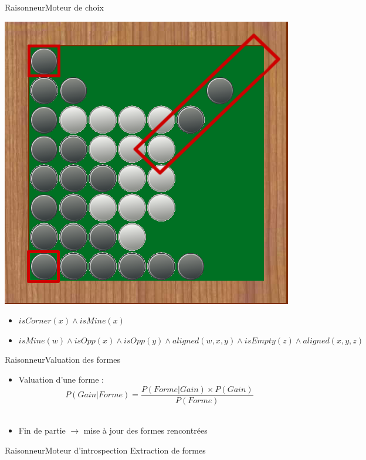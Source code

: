 \begin{frame}{Raisonneur}{Moteur de choix}
	\begin{minipage}{0.45\textwidth}
		\includegraphics[width=\textwidth]{img/screenshoot/raisonneur_choix_2}
	\end{minipage}
	\begin{minipage}{0.50\textwidth}
		\begin{itemize}
			\item $isCorner(x) \wedge isMine(x)$
			\item $isMine(w) \wedge isOpp(x) \wedge isOpp(y) \wedge aligned(w,x,y) \wedge isEmpty(z) \wedge aligned (x,y,z)$
		\end{itemize}
	\end{minipage}
\end{frame}

\begin{frame}{Raisonneur}{Valuation des formes}
	\begin{itemize}
			\item Valuation d'une forme :
			\[ P(Gain|Forme) = \frac{P(Forme|Gain) \times P(Gain)}{P(Forme)} \]\\[20pt]
			\item Fin de partie $\rightarrow$ mise à jour des formes rencontrées
		\end{itemize}
	
\end{frame}

\begin{frame}{Raisonneur}{Moteur d'introspection}
Extraction de formes
\end{frame}

